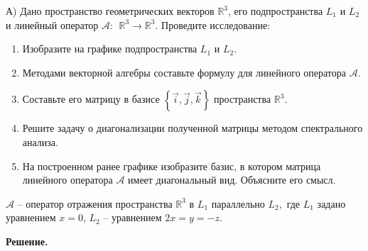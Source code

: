 А) Дано пространство геометрических векторов  $\mathbb{R}^3$, его подпространства  $L_1$  и  $L_2$  и линейный оператор  $\mathcal{A}:\ \ \mathbb{R}^3\rightarrow\mathbb{R}^3$.
Проведите исследование:
\begin{enumerate}
    \item Изобразите на графике подпространства  $L_1$  и  $L_2$.
    \item Методами векторной алгебры составьте формулу для линейного оператора  $\mathcal{A}$.
    \item Составьте его матрицу в базисе $\left\{\vec{i},\vec{j},\vec{k}\right\}$ пространства $\mathbb{R}^3$.
    \item Решите задачу о диагонализации полученной матрицы методом спектрального анализа.
    \item На построенном ранее графике изобразите базис, в котором матрица линейного оператора $\mathcal{A}$ имеет диагональный вид. Объясните его смысл.
\end{enumerate}

$\mathcal{A}$ – оператор отражения пространства  $\mathbb{R}^3$ в $L_1$ параллельно $L_2,$ где $L_1$ задано уравнением $x=0$, $L_2$ – уравнением  $2x=y=-z$.

\vspace{10mm}

\textbf{Решение.}

